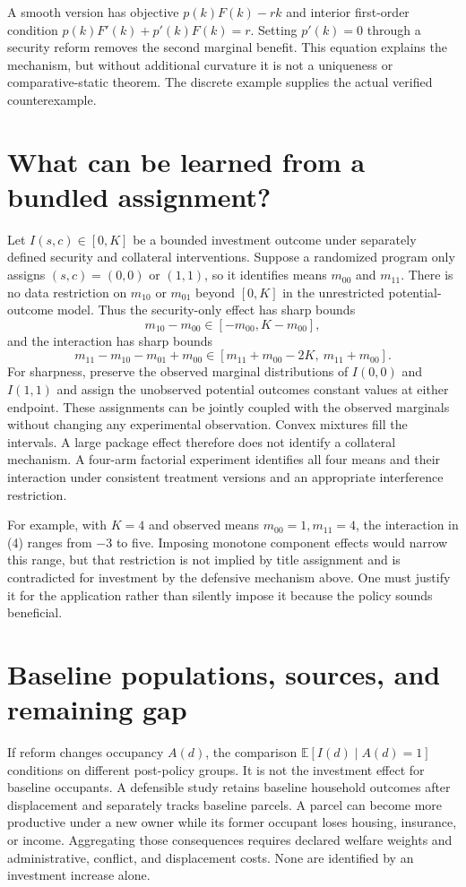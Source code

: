 \documentclass[11pt]{article}
\newcommand{\E}{\mathbb{E}}
\begin{document}
A smooth version has objective $p(k)F(k)-rk$ and interior first-order
condition $p(k)F'(k)+p'(k)F(k)=r$. Setting $p'(k)=0$ through a security
reform removes the second marginal benefit. This equation explains the
mechanism, but without additional curvature it is not a uniqueness or
comparative-static theorem. The discrete example supplies the actual
verified counterexample.

\section{What can be learned from a bundled assignment?}
Let $I(s,c)\in[0,K]$ be a bounded investment outcome under separately defined
security and collateral interventions. Suppose a randomized program only
assigns $(s,c)=(0,0)$ or $(1,1)$, so it identifies means $m_{00}$ and
$m_{11}$. There is no data restriction on $m_{10}$ or $m_{01}$ beyond
$[0,K]$ in the unrestricted potential-outcome model. Thus the security-only
effect has sharp bounds
\[
 m_{10}-m_{00}\in[-m_{00},K-m_{00}],                        \tag{3}
\]
and the interaction has sharp bounds
\[
 m_{11}-m_{10}-m_{01}+m_{00}
 \in[m_{11}+m_{00}-2K,\ m_{11}+m_{00}].                   \tag{4}
\]
For sharpness, preserve the observed marginal distributions of $I(0,0)$
and $I(1,1)$ and assign the unobserved potential outcomes constant values
at either endpoint. These assignments can be jointly coupled with the
observed marginals without changing any experimental observation. Convex
mixtures fill the intervals. A large package effect therefore does not
identify a collateral mechanism. A four-arm factorial experiment identifies
all four means and their interaction under consistent treatment versions
and an appropriate interference restriction.

For example, with $K=4$ and observed means $m_{00}=1,m_{11}=4$, the
interaction in (4) ranges from $-3$ to five. Imposing monotone component
effects would narrow this range, but that restriction is not implied by
title assignment and is contradicted for investment by the defensive
mechanism above. One must justify it for the application rather than
silently impose it because the policy sounds beneficial.

\section{Baseline populations, sources, and remaining gap}
If reform changes occupancy $A(d)$, the comparison
$\E[I(d)\mid A(d)=1]$ conditions on different post-policy groups. It is
not the investment effect for baseline occupants. A defensible study
retains baseline household outcomes after displacement and separately
tracks baseline parcels. A parcel can become more productive under a new
owner while its former occupant loses housing, insurance, or income.
Aggregating those consequences requires declared welfare weights and
administrative, conflict, and displacement costs. None are identified by
an investment increase alone.
\end{document}
